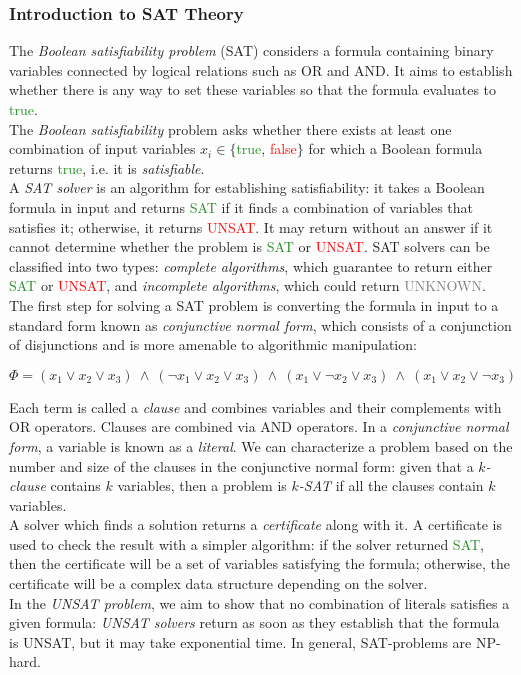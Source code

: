 \documentclass[]{usiinfbachelorproject}
\begin{document}
\subsubsection{Introduction to SAT Theory}\label{subsubsec:sat-theory}
The \textit{Boolean satisfiability problem} (SAT) considers a formula containing binary variables connected by logical relations such as OR and AND. It aims to establish whether there is any way to set these variables so that the formula evaluates to \textcolor{ForestGreen}{true}. \\
The \textit{Boolean satisfiability} problem asks whether there exists at least one combination of input variables $x_i \in \{$\textcolor{ForestGreen}{true}, \textcolor{red}{false}$\}$ for which a Boolean formula returns \textcolor{ForestGreen}{true}, i.e. it is \textit{satisfiable}. \\
A \textit{SAT solver} \cite{sat} is an algorithm for establishing satisfiability: it takes a Boolean formula in input and returns \textcolor{ForestGreen}{SAT} if it finds a combination of variables that satisfies it; otherwise, it returns \textcolor{red}{UNSAT}. It may return without an answer if it cannot determine whether the problem is \textcolor{ForestGreen}{SAT} or \textcolor{red}{UNSAT}.
SAT solvers can be classified into two types: \textit{complete algorithms}, which guarantee to return either \textcolor{ForestGreen}{SAT} or \textcolor{red}{UNSAT}, and \textit{incomplete algorithms}, which could return \textcolor{gray}{UNKNOWN}. \\
The first step for solving a SAT problem is converting the formula in input to a standard form known as \textit{conjunctive normal form}, which consists of a conjunction of disjunctions and is more amenable to algorithmic manipulation:
\begin{center}
    $\Phi = (x_1 \lor x_2 \lor x_3)\ \land\ (\neg x_1 \lor x_2 \lor x_3)\ \land\ (x_1 \lor \neg x_2 \lor x_3) \ \land\ (x_1 \lor x_2 \lor \neg x_3)  $
\end{center}
Each term is called a \textit{clause} and combines variables and their complements with OR operators. Clauses are combined via AND operators. In a \textit{conjunctive normal form}, a variable is known as a \textit{literal}. We can characterize a problem based on the number and size of the clauses in the conjunctive normal form: given that a \textit{$k$-clause} contains $k$ variables, then a problem is \textit{$k$-SAT} if all the clauses contain $k$ variables. \\
A solver which finds a solution returns a \textit{certificate} along with it. A certificate is used to check the result with a simpler algorithm: if the solver returned \textcolor{ForestGreen}{SAT}, then the certificate will be a set of variables satisfying the formula; otherwise, the certificate will be a complex data structure depending on the solver. \\
In the \textit{UNSAT problem}, we aim to show that no combination of literals satisfies a given formula: \textit{UNSAT solvers} return as soon as they establish that the formula is UNSAT, but it may take exponential time. In general, SAT-problems are NP-hard.
\end{document}
